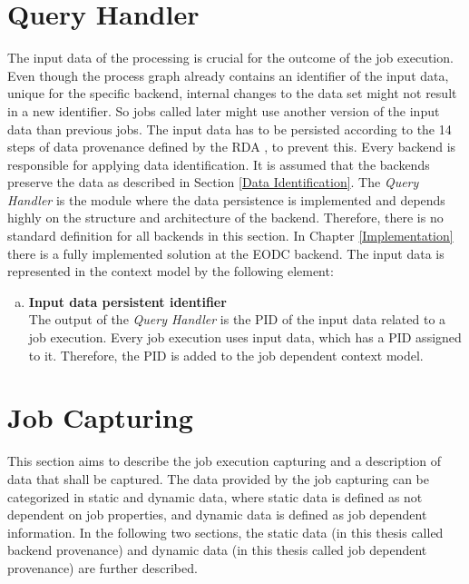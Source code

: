 \documentclass[draft,final]{vutinfth} %
\begin{document}
\section{Query Handler}\label{Design:Data Identification}
The input data of the processing is crucial for the outcome of the job execution. Even though the process graph already contains an identifier of the input data, unique for the specific backend, internal changes to the data set might not result in a new identifier. So jobs called later might use another version of the input data than previous jobs. The input data has to be persisted according to the 14 steps of data provenance defined by the RDA \cite{rauber2016identification}, to prevent this. Every backend is responsible for applying data identification. It is assumed that the backends preserve the data as described in Section \ref{Data Identification}. The \textit{Query Handler} is the module where the data persistence is implemented and depends highly on the structure and architecture of the backend. Therefore, there is no standard definition for all backends in this section. In Chapter \ref{Implementation} there is a fully implemented solution at the EODC backend. The input data is represented in the context model by the following element: 

\begin{enumerate}[(a)]
\item \textbf{Input data persistent identifier} \\
	The output of the \textit{Query Handler} is the PID of the input data related to a job execution. Every job execution uses input data, which has a PID assigned to it. Therefore, the PID is added to the job dependent context model. 
\end{enumerate}

\section{Job Capturing}\label{Design:Job Capturing}
This section aims to describe the job execution capturing and a description of data that shall be captured. The data provided by the job capturing can be categorized in static and dynamic data, where static data is defined as not dependent on job properties, and dynamic data is defined as job dependent information. In the following two sections, the static data (in this thesis called backend provenance) and dynamic data (in this thesis called job dependent provenance) are further described.      
\end{document}
